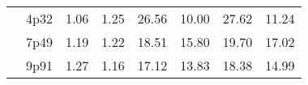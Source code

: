 \documentclass[12pt,A4paper]{article}
\begin{document}
\begin{table}[]
\begin{tabular}{llllllll}
\multicolumn{1}{|l|}{} & \multicolumn{1}{l|}{4p32} & \multicolumn{1}{c|}{1.06}        & \multicolumn{1}{c|}{1.25}         & \multicolumn{1}{c|}{26.56}        & \multicolumn{1}{c|}{10.00}         & \multicolumn{1}{c|}{27.62}        & \multicolumn{1}{c|}{11.24}         \\ \cline{2-8}
\multicolumn{1}{|l|}{} & \multicolumn{1}{l|}{7p49} & \multicolumn{1}{c|}{1.19}        & \multicolumn{1}{c|}{1.22}         & \multicolumn{1}{c|}{18.51}        & \multicolumn{1}{c|}{15.80}         & \multicolumn{1}{c|}{19.70}        & \multicolumn{1}{c|}{17.02}         \\ \cline{2-8}
\multicolumn{1}{|l|}{} & \multicolumn{1}{l|}{9p91} & \multicolumn{1}{c|}{1.27}        & \multicolumn{1}{c|}{1.16}         & \multicolumn{1}{c|}{17.12}        & \multicolumn{1}{c|}{13.83}         & \multicolumn{1}{c|}{18.38}        & \multicolumn{1}{c|}{14.99}         \\ \hline

\end{tabular}
\end{table}
\end{document}
